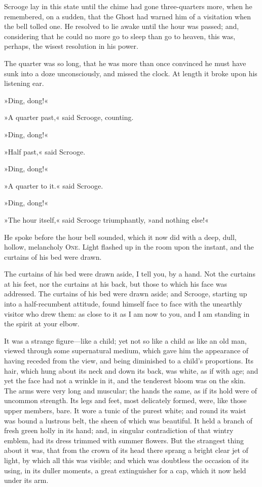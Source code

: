 Scrooge lay in this state until the chime had gone three-quarters more, when he remembered, on a sudden, that the Ghost had warned him of a visitation when the bell tolled one. He resolved to lie awake until the hour was passed; and, considering that he could no more go to sleep than go to heaven, this was, perhaps, the wisest resolution in his power.

The quarter was so long, that he was more than once convinced he must have sunk into a doze unconsciously, and missed the clock. At length it broke upon his listening ear.

»Ding, dong!«

»A quarter past,« said Scrooge, counting.

»Ding, dong!«

»Half past,« said Scrooge.

»Ding, dong!«

»A quarter to it.« said Scrooge.

»Ding, dong!«

»The hour itself,« said Scrooge triumphantly, »and nothing else!«

He spoke before the hour bell sounded, which it now did with a deep, dull, hollow, melancholy \textsc{One}. Light flashed up in the room upon the instant, and the curtains of his bed were drawn.

The curtains of his bed were drawn aside, I tell you, by a hand. Not the curtains at his feet, nor the curtains at his back, but those to which his face was addressed. The curtains of his bed were drawn aside; and Scrooge, starting up into a half-recumbent attitude, found himself face to face with the unearthly visitor who drew them: as close to it as I am now to you, and I am standing in the spirit at your elbow.

It was a strange figure—like a child; yet not so like a child as like an old man, viewed through some supernatural medium, which gave him the appearance of having receded from the view, and being diminished to a child's proportions. Its hair, which hung about its neck and down its back, was white, as if with age; and yet the face had not a wrinkle in it, and the tenderest bloom was on the skin. The arms were very long and muscular; the hands the same, as if its hold were of uncommon strength. Its legs and feet, most delicately formed, were, like those upper members, bare. It wore a tunic of the purest white; and round its waist was bound a lustrous belt, the sheen of which was beautiful. It held a branch of fresh green holly in its hand; and, in singular contradiction of that wintry emblem, had its dress trimmed with summer flowers. But the strangest thing about it was, that from the crown of its head there sprang a bright clear jet of light, by which all this was visible; and which was doubtless the occasion of its using, in its duller moments, a great extinguisher for a cap, which it now held under its arm.

